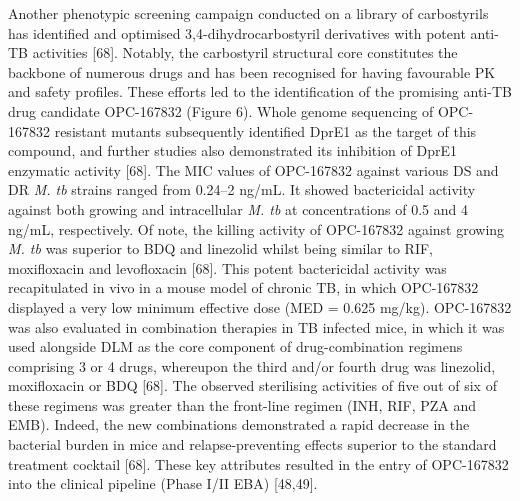 \documentclass{article}
\begin{document}
Another phenotypic screening campaign conducted on a library of carbostyrils has identified and optimised 3,4-dihydrocarbostyril derivatives with potent anti-TB activities [68]. Notably, the carbostyril structural core constitutes the backbone of numerous drugs and has been recognised for having favourable PK and safety profiles. These efforts led to the identification of the promising anti-TB drug candidate OPC-167832 (Figure 6). Whole genome sequencing of OPC-167832 resistant mutants subsequently identified DprE1 as the target of this compound, and further studies also demonstrated its inhibition of DprE1 enzymatic activity [68]. The MIC values of OPC-167832 against various DS and DR \textit{M. tb} strains ranged from 0.24–2 ng/mL. It showed bactericidal activity against both growing and intracellular \textit{M. tb} at concentrations of 0.5 and 4 ng/mL, respectively. Of note, the killing activity of OPC-167832 against growing \textit{M. tb} was superior to BDQ and linezolid whilst being similar to RIF, moxifloxacin and levofloxacin [68]. This potent bactericidal activity was recapitulated in vivo in a mouse model of chronic TB, in which OPC-167832 displayed a very low minimum effective dose (MED = 0.625 mg/kg). OPC-167832 was also evaluated in combination therapies in TB infected mice, in which it was used alongside DLM as the core component of drug-combination regimens comprising 3 or 4 drugs, whereupon the third and/or fourth drug was linezolid, moxifloxacin or BDQ [68]. The observed sterilising activities of five out of six of these regimens was greater than the front-line regimen (INH, RIF, PZA and EMB). Indeed, the new combinations demonstrated a rapid decrease in the bacterial burden in mice and relapse-preventing effects superior to the standard treatment cocktail [68]. These key attributes resulted in the entry of OPC-167832 into the clinical pipeline (Phase I/II EBA) [48,49].
\end{document}
